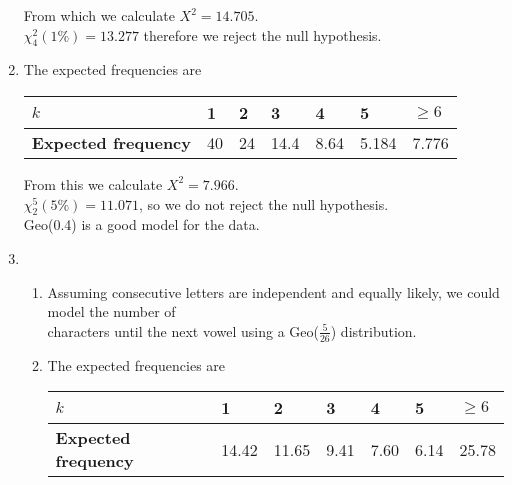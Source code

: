 \documentclass[fleqn]{article}
\begin{document}
\begin{enumerate}
        From which we calculate $X^2=14.705$. \\
        $\chi_4^2(1\%)=13.277$ therefore we reject the null hypothesis.
    \item The expected frequencies are \vspace{2mm}\\
        \begin{tabularx}{0.73\textwidth}{|X|*6{P{12mm}|}}
            \hline
            \textbf{$k$}                  & 1  & 2  & 3    & 4    & 5     & $\geq6$     \\\hline
            \textbf{Expected frequency}   & 40 & 24 & 14.4 & 8.64 & 5.184 & 7.776       \\\hline
        \end{tabularx}\vspace{4mm}
        
        From this we calculate $X^2=7.966$.                              \\
        $\chi_2^5(5\%)=11.071$, so we do not reject the null hypothesis. \\
        Geo(0.4) is a good model for the data.
    \item \begin{enumerate}[label=\bfseries \alph*\space ]
            \item Assuming consecutive letters are independent and equally likely, we could model the number of \\characters until the next vowel using a Geo($\tfrac{5}{26}$) distribution.
            \item The expected frequencies are \vspace{2mm}\\
                \begin{tabularx}{0.73\textwidth}{|X|*6{P{12mm}|}}
                    \hline
                    \textbf{$k$}                  & 1     & 2     & 3    & 4    & 5    & $\geq6$     \\\hline
                    \textbf{Expected frequency}   & 14.42 & 11.65 & 9.41 & 7.60 & 6.14 & 25.78       \\\hline
                \end{tabularx}\vspace{4mm}
                

\end{enumerate}
\end{enumerate}
\end{document}
